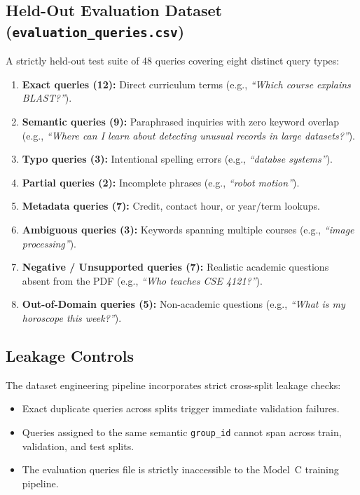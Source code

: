 \documentclass[12pt,a4paper]{report}
\begin{document}
\subsection{Held-Out Evaluation Dataset (\texttt{evaluation\_queries.csv})}
A strictly held-out test suite of 48 queries covering eight distinct query types:
\begin{enumerate}
    \item \textbf{Exact queries (12):} Direct curriculum terms (e.g., \textit{``Which course explains BLAST?''}).
    \item \textbf{Semantic queries (9):} Paraphrased inquiries with zero keyword overlap (e.g., \textit{``Where can I learn about detecting unusual records in large datasets?''}).
    \item \textbf{Typo queries (3):} Intentional spelling errors (e.g., \textit{``databse systems''}).
    \item \textbf{Partial queries (2):} Incomplete phrases (e.g., \textit{``robot motion''}).
    \item \textbf{Metadata queries (7):} Credit, contact hour, or year/term lookups.
    \item \textbf{Ambiguous queries (3):} Keywords spanning multiple courses (e.g., \textit{``image processing''}).
    \item \textbf{Negative / Unsupported queries (7):} Realistic academic questions absent from the PDF (e.g., \textit{``Who teaches CSE 4121?''}).
    \item \textbf{Out-of-Domain queries (5):} Non-academic questions (e.g., \textit{``What is my horoscope this week?''}).
\end{enumerate}

\subsection{Leakage Controls}
The dataset engineering pipeline incorporates strict cross-split leakage checks:
\begin{itemize}
    \item Exact duplicate queries across splits trigger immediate validation failures.
    \item Queries assigned to the same semantic \texttt{group\_id} cannot span across train, validation, and test splits.
    \item The evaluation queries file is strictly inaccessible to the Model~C training pipeline.
\end{itemize}
\end{document}
